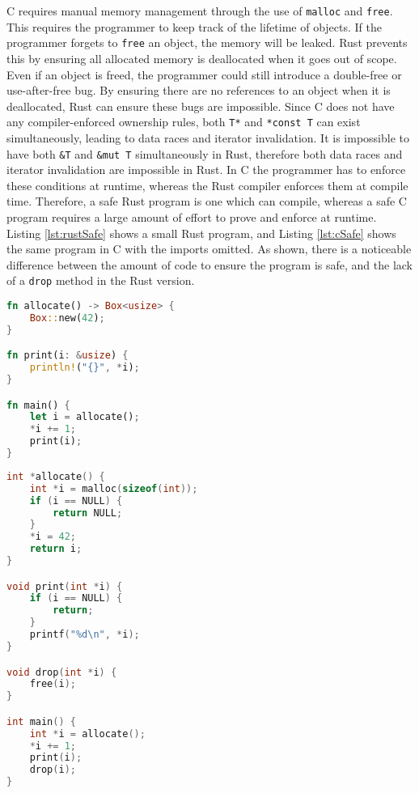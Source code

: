 \documentclass[10pt,a4paper,twocolumn]{article}
\begin{document}
C requires manual memory management through the use of \lstinline{malloc} and \lstinline{free}.
This requires the programmer to keep track of the lifetime of objects.
If the programmer forgets to \lstinline{free} an object, the memory will be leaked.
Rust prevents this by ensuring all allocated memory is deallocated when it goes out of scope.
Even if an object is freed, the programmer could still introduce a double-free or use-after-free
bug.
By ensuring there are no references to an object when it is deallocated, Rust can ensure these bugs
are impossible.
Since C does not have any compiler-enforced ownership rules, both \lstinline{T*} and
\lstinline{*const T} can exist simultaneously, leading to data races and iterator invalidation.
It is impossible to have both \lstinline{&T} and \lstinline{&mut T} simultaneously in Rust,
therefore both data races and iterator invalidation are impossible in Rust.
In C the programmer has to enforce these conditions at runtime, whereas the Rust compiler enforces
them at compile time.
Therefore, a safe Rust program is one which can compile, whereas a safe C program requires a large
amount of effort to prove and enforce at runtime.
Listing \ref{lst:rustSafe} shows a small Rust program, and Listing \ref{lst:cSafe} shows the same
program in C with the imports omitted.
As shown, there is a noticeable difference between the amount of code to ensure the program is
safe, and the lack of a \lstinline{drop} method in the Rust version.

\begin{lstlisting}[language=Rust, float=h, label=lst:rustSafe, caption={A short safe Rust program
	to allocate, increment, print and deallocate an integer.}]
fn allocate() -> Box<usize> {
	Box::new(42);
}

fn print(i: &usize) {
	println!("{}", *i);
}

fn main() {
	let i = allocate();
	*i += 1;
	print(i);
}
\end{lstlisting}

\begin{lstlisting}[language=C, float=h, label=lst:cSafe, caption={A short safe C program to
	to allocate, increment, print and deallocate an integer.}]
int *allocate() {
	int *i = malloc(sizeof(int));
	if (i == NULL) {
		return NULL;
	}
	*i = 42;
	return i;
}

void print(int *i) {
	if (i == NULL) {
		return;
	}
	printf("%d\n", *i);
}

void drop(int *i) {
	free(i);
}

int main() {
	int *i = allocate();
	*i += 1;
	print(i);
	drop(i);
}
\end{lstlisting}
\end{document}
